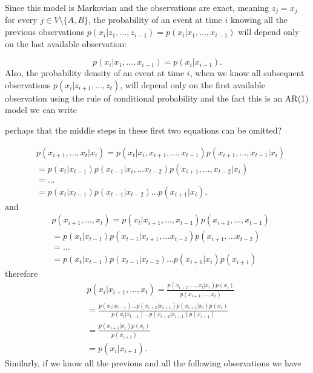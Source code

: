 Since this model is Markovian and the observations are exact, meaning $z_j = x_j$ for every $j \in V \setminus \{A,B\} $, the probability of an event at time $i$ knowing all the previous observations $p(x_i | z_1, \dots, z_{i-1}) = p(x_i | x_1, \dots, x_{i-1})$ will depend only on the last available observation:

\begin{equation*}
    p(x_i | x_1, \dots, x_{i-1}) = p(x_i | x_{i-1}).   
\end{equation*}
Also, the probability density of an event at time $i$, when we know all subsequent observations $p(x_i | z_{i+1}, \dots, z_t)$, will depend only on the first available observation using the rule of conditional probability and the fact this is an AR(1) model we can write

{\color{red} perhaps that the middle steps in these first two equations can be omitted?}

\begin{align*}
    &p(x_{i+1}, \dots, x_t | x_i) = p(x_t | x_i, x_{i+1}, \dots, x_{t-1}) p(x_{i+1}, \dots, x_{t-1} | x_i)\\
    &= p(x_t | x_{t-1}) p(x_{t-1} | x_i, \dots x_{t-2}) p(x_{i+1}, \dots, x_{t-2} | x_i)\\
    &= \dots\\
    &= p(x_t | x_{t-1})p(x_{t-1} | x_{t-2}) \dots p(x_{i+1} | x_i),
\end{align*}
and
\begin{align*}
    &p(x_{i+1}, \dots, x_t) = p(x_t | x_{i+1}, \dots, x_{t-1}) p(x_{i+1}, \dots, x_{t-1})\\
    &= p(x_t | x_{t-1}) p(x_{t-1} | x_{i+1}, \dots x_{t-2}) p(x_{i+1}, \dots x_{t-2})\\
    &= \dots\\
    &= p(x_t | x_{t-1})p(x_{t-1} | x_{t-2}) \dots p(x_{i+1} | x_i) p(x_{i+1})
\end{align*}
therefore
\begin{align*}
    &p(x_i | x_{i+1}, \dots, x_t) = \frac{p(x_{i+1},\dots, x_t | x_i) p(x_i)}{p(x_{i+1}, \dots, x_t)}\\
    &= \frac{p(x_t | x_{t-1})\dots p(x_{i+2} | x_{i+1}) p(x_{i+1} | x_i) p(x_i)}{p(x_t | x_{t-1})\dots p(x_{i+2} | x_{i+1}) p(x_{i+1})}\\
    &= \frac{p(x_{i+1} | x_i) p(x_i)}{p(x_{i+1})}\\
    &= p(x_i | x_{i+1}).
\end{align*}
Similarly, if we know all the previous and all the following observations we have

